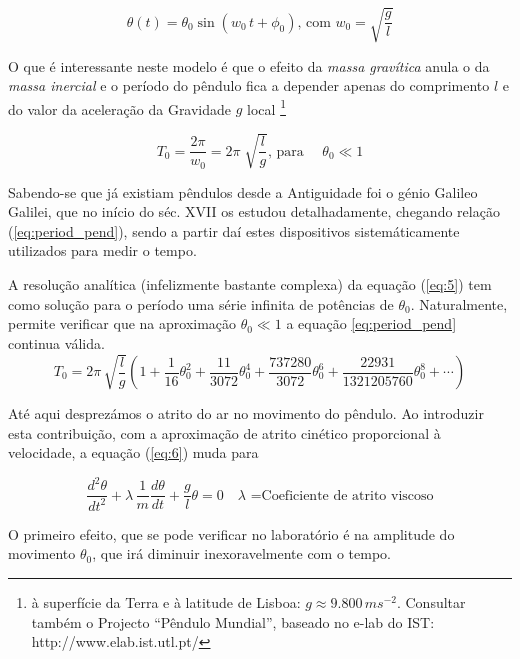 \documentclass[a4paper,twoside,12pt]{article}      %
\begin{document}
\begin{equation}
	\label{eq:solu_pend}
\theta (t) = \theta_0 \sin(w_0 \, t + \phi_0) \text{, com } w_0 = \sqrt{\frac{g}{l}}
\end{equation}

O que é interessante neste modelo é que o efeito da \emph{massa gravítica } anula o da \emph{massa inercial } e o período do pêndulo fica a  depender apenas do comprimento $l$  e do valor da aceleração da Gravidade $g$  local 
\footnote{à superfície da Terra e à latitude de Lisboa: $g\approx 9.800\,m s^{-2}$. Consultar também o Projecto ``Pêndulo Mundial'', baseado no e-lab do IST: http://www.elab.ist.utl.pt/}

\begin{equation}
	\label{eq:period_pend}
T_0 = \frac{2 \pi}{w_0} = 2\pi\; \sqrt{\frac{l}{g}} \text{, para }	\quad \theta_0 \ll 1
\end{equation}

Sabendo-se que já existiam pêndulos  desde a Antiguidade foi o génio  Galileo Galilei, que no início do séc. XVII os estudou detalhadamente, chegando relação (\ref{eq:period_pend}), sendo a partir daí 
estes dispositivos sistemáticamente utilizados para medir o tempo.

A resolução analítica (infelizmente bastante complexa) da equação 	(\ref{eq:5})  tem como solução para o período uma série  infinita de potências de $\theta_0$. 
Naturalmente, permite verificar que na aproximação $\theta_0 \ll 1$ a equação \ref{eq:period_pend} continua válida.
\begin{equation}
	\label{eq:period_pend_exa}
T_0 =  2\pi\, \sqrt{\frac{l}{g}} \left(1 + \frac{1}{16} \theta_0^{2} + \frac{11}{3072} \theta_0^{4} +
 \frac{737280}{3072} \theta_0^{6} + \frac{22931}{1321205760} \theta_0^{8} + \cdots \right)
\end{equation}

Até aqui desprezámos o atrito do ar no movimento do pêndulo. Ao introduzir esta contribuição, com a aproximação de atrito cinético 
proporcional à velocidade, a  equação	(\ref{eq:6}) muda para

\begin{equation}
	 \frac{d^2 \theta}{dt^2} + \lambda \, \frac{1}{m}  \frac{d \theta}{dt} + \frac{g}{l} \theta =0 \quad \lambda \text{ =Coeficiente de atrito viscoso}
\end{equation}

O primeiro efeito, que se pode verificar no laboratório é na amplitude do movimento $\theta_0$, que irá diminuir inexoravelmente com o tempo. 
\end{document}
